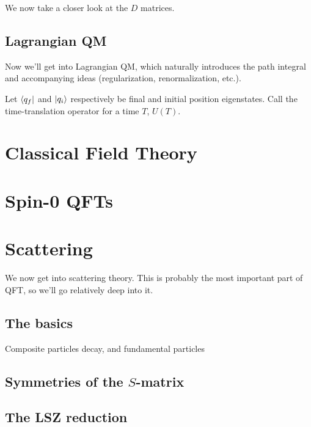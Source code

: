 \documentclass[11pt]{article}
\begin{document}
We now take a closer look at the $D$ matrices. 

\subsection{Lagrangian QM}

Now we'll get into Lagrangian QM, which naturally introduces
the path integral and accompanying ideas (regularization, renormalization,
etc.).

\begin{iidea}
    Let $\langle q_f\rvert$ and $\lvert q_i\rangle$ respectively be final
    and initial position eigenstates. Call the time-translation
    operator for a time $T$, $U(T)$. 
\end{iidea}


\section{Classical Field Theory}

\section{Spin-0 QFTs}

\section{Scattering}

We now get into scattering theory. This is probably the most
important part of QFT, so we'll go relatively deep into it.

\subsection{The basics}

Composite particles decay, and fundamental particles




\subsection{Symmetries of the $S$-matrix}

\subsection{The LSZ reduction}
\end{document}
